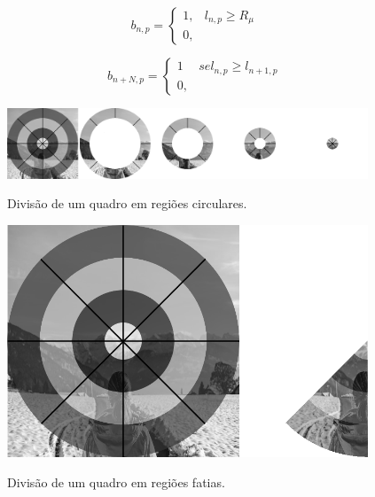 \begin{equation}
	b_{n,p} = \left\{
    \begin{array}{lr}
      1, & l_{n,p} \geqslant R_\mu\\
      0, & 
    \end{array}
  \right.
  \label{eq:rbp_aneis}
\end{equation}

\begin{equation}
	b_{n+N,p} = \left\{
    \begin{array}{lr}
      1 & se l_{n,p} \geqslant l_{n+1,p}\\
      0, & 
    \end{array}
  \right.
  \label{eq:rbp_fatias}
\end{equation}


 \begin{figure}[h]
      \centering
      \caption{Divisão de um quadro em regiões circulares.}
      \includegraphics[width=0.96\textwidth]{dados/figuras/brp_aneis}
       	\label{fig:aneis_rbp}
    \end{figure} 
\begin{figure}[h]
      \centering
      \caption{Divisão de um quadro em regiões fatias.}
      \includegraphics[width=0.96\textwidth]{dados/figuras/brp_fatia}
       	\label{fig:fatias_rbp}
    \end{figure} 

